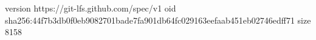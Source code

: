 version https://git-lfs.github.com/spec/v1
oid sha256:44f7b3db0f0eb9082701bade7fa901db64fc029163eefaab451eb02746edff71
size 8158
